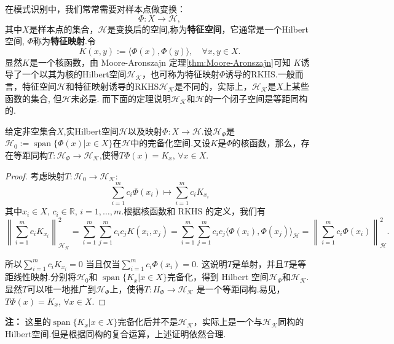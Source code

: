 \documentclass[../master.tex]{subfiles}
\begin{document}
在模式识别中，我们常常需要对样本点做变换：
\begin{equation}\label{def:特征映射}
    \Phi:X\to \mathcal{H},
\end{equation}
其中$X$是样本点的集合，$\mathcal{H}$是变换后的空间,称为\textbf{特征空间}，它通常是一个Hilbert空间, $\Phi$称为\textbf{特征映射}.令
\begin{equation*}
    K(x,y):=\langle \Phi(x),\Phi(y)\rangle,\quad\forall x,y\in X.
\end{equation*}
显然$K$是一个核函数，由 Moore-Aronszajn 定理\ref{thm:Moore-Aronszajn}可知 $K$诱导了一个以其为核的Hilbert空间$\mathcal{H_K}$，也可称为特征映射$\Phi$诱导的RKHS.一般而言，特征空间$\mathcal{H}$和特征映射诱导的RKHS$\mathcal{H_K}$是不同的，实际上，$\mathcal{H_K}$是$X$上某些函数的集合, 但$\mathcal{H}$未必是. 而下面的定理说明$\mathcal{H_K}$和$\mathcal{H}$的一个闭子空间是等距同构的.

\begin{theorem}[特征映射诱导的RKHS等距嵌入特征空间]\label{thm:特征映射诱导的RKHS等距嵌入特征空间}
    给定非空集合$X$,实Hilbert空间$\mathcal{H}$以及映射$\Phi:X\to \mathcal{H}.$设$\mathcal{H}_{\Phi}$是$\mathcal{H}_{0}:=\operatorname{span}\{\Phi(x)|x\in X\}$在$\mathcal{H}$中的完备化空间.又设$K$是$\Phi$的核函数，那么，存在等距同构$T:\mathcal{H}_\Phi\to\mathcal{H_K}$,使得$T\Phi ( x) = K_x$, $\forall x\in X.$
\end{theorem}

\begin{proof}
    考虑映射$T:\mathcal{H}_0\to\mathcal{H_K}$:
    \begin{equation*}
        \sum_{i=1}^m c_i\Phi(x_i)\mapsto\sum_{i=1}^mc_iK_{x_i}
    \end{equation*}
    其中$x_i\in X$, $c_i\in \mathbb{R}$, $i= 1, \dots , m.$根据核函数和 RKHS 的定义，我们有
$$\left\|\sum_{i=1}^{m}c_{i}K_{x_{i}}\right\|_{\mathcal{H_K}}^{2}=\sum_{i=1}^{m}\sum_{j=1}^{m}c_{i}c_{j}K(x_{i},x_{j})=\sum_{i=1}^{m}\sum_{j=1}^{m}c_{i}c_{j}\langle\Phi(x_{i}),\Phi(x_{j})\rangle_{\mathcal{H}}=\left\|\sum_{i=1}^{m}c_{i}\Phi(x_{i})\right\|_{\mathcal{H}}^{2}.$$

所以$\sum_{i=1}^{m}c_{i}K_{x_{i}}=0$ 当且仅当$\sum_{i=1}^{m}c_{i}\Phi(x_{i})=0.$ 这说明$T$是单射，并且$T$是等距线性映射.分别将$\mathcal{H}_0$和 $\operatorname{span}\{K_x|x\in X\}$完备化，得到 Hilbert 空间$\mathcal{H}_\Phi$和$\mathcal{H_K}.$显然$T$可以唯一地推广到$\mathcal{H}_\Phi$上，使得$T:H_\Phi\to\mathcal{H_K}$ 是一个等距同构.易见，$T\Phi ( x) = K_x$, $\forall x\in X.$

\end{proof}
\textbf{注：} 这里的$\operatorname{span}\{K_x|x\in X\}$完备化后并不是$\mathcal{H_K}$，实际上是一个与$\mathcal{H_K}$同构的Hilbert空间.但是根据同构的复合运算，上述证明依然合理.
\end{document}
